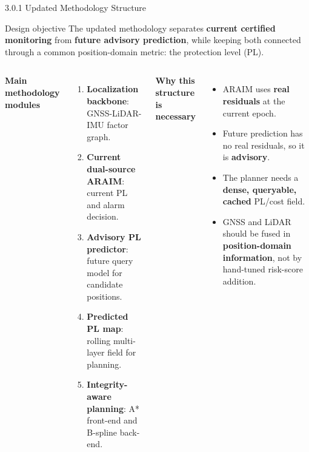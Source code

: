 \documentclass[10pt,aspectratio=169,xcolor=dvipsnames]{beamer}
\newcommand{\innov}[1]{\textcolor{NavyBlue}{\textbf{#1}}}
\begin{document}
\begin{frame}{3.0.1 Updated Methodology Structure}
  \small
  \begin{block}{Design objective}
    The updated methodology separates \innov{current certified monitoring} from \innov{future advisory prediction}, while keeping both connected through a common position-domain metric: the protection level (PL).
  \end{block}

  \begin{columns}[T]
    \textbf{Main methodology modules}
    \begin{enumerate}\footnotesize
      \item \textbf{Localization backbone}: GNSS-LiDAR-IMU factor graph.
      \item \textbf{Current dual-source ARAIM}: current PL and alarm decision.
      \item \textbf{Advisory PL predictor}: future query model for candidate positions.
      \item \textbf{Predicted PL map}: rolling multi-layer field for planning.
      \item \textbf{Integrity-aware planning}: A* front-end and B-spline back-end.
    \end{enumerate}

    \textbf{Why this structure is necessary}
    \begin{itemize}\footnotesize
      \item ARAIM uses \textbf{real residuals} at the current epoch.
      \item Future prediction has no real residuals, so it is \textbf{advisory}.
      \item The planner needs a \textbf{dense, queryable, cached} PL/cost field.
      \item GNSS and LiDAR should be fused in \textbf{position-domain information}, not by hand-tuned risk-score addition.
    \end{itemize}
  \end{columns}
\end{frame}
\end{document}

